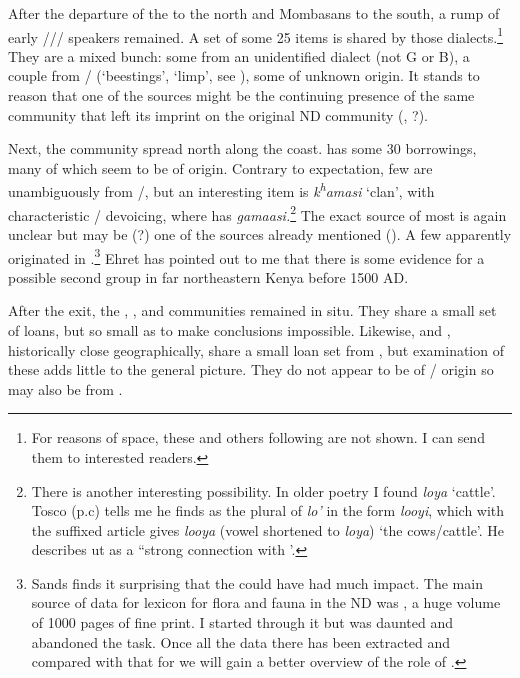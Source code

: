 \documentclass[output=paper,newtxmath,modfonts,nonflat,hidelinks]{langsci/langscibook}
\begin{document}
  After the departure of the  to the north and Mombasans to the south, a rump of early /// speakers remained.  A set of some 25 items is shared by those dialects.\footnote{For reasons of space, these and others following are not shown. I can send them to interested readers.}  They are a mixed bunch: some from an unidentified  dialect (not G or B), a couple from / (‘beestings’, ‘limp’, see ), some of unknown origin. It stands to reason that one of the sources might be the continuing presence of the same  community that left its imprint on the original ND community (, ?).

  Next, the  community spread north along the coast.  has some 30 borrowings, many of which seem to be of  origin. Contrary to expectation, few are unambiguously from /, but an interesting item is \textit{k\textsuperscript{h}}\textit{amasi} ‘clan’, with characteristic / devoicing, where  has \textit{gamaasi.}\footnote{There is another interesting possibility. In older  poetry I found \textit{loya} ‘cattle’. Tosco (p.c) tells me he finds as the plural of \textit{lo’} in  the form \textit{looyi}, which with the suffixed article gives \textit{looya} (vowel shortened to  \textit{loya}) ‘the cows/cattle’. He describes ut as a “strong connection with ’.} The exact  source of most is again unclear but may be (?) one of the sources already mentioned (). A few apparently originated in .\footnote{Sands finds it surprising that the  could have had much impact. The main source of data for lexicon for flora and fauna in the ND was \citet{Sacleux1939}, a huge volume of 1000 pages of fine print. I started through it but was daunted and abandoned the task. Once all the data there has been extracted and compared with that for  we will gain a better overview of the role of .} Ehret has pointed out to me that there is some evidence for a possible second  group in far northeastern Kenya before 1500 AD. 

  After the  exit, the , , and  communities remained in situ. They share a small set of loans, but so small as to make conclusions impossible. Likewise,  and , historically close geographically, share a small loan set from , but examination of these adds little to the general picture. They do not appear to be of / origin so may also be from . 
\end{document}
